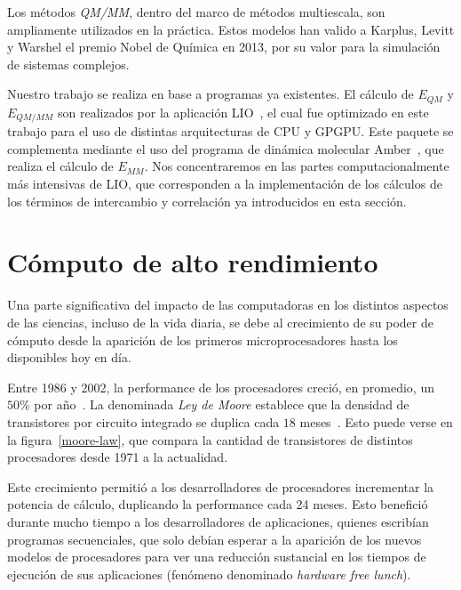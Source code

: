 Los m\'etodos \textit{QM/MM}, dentro del marco de m\'etodos multiescala, son ampliamente utilizados en la pr\'actica. 
Estos modelos han valido a Karplus, Levitt y Warshel el premio Nobel de Qu\'imica en 2013, por su valor para la simulaci\'on de sistemas complejos.

Nuestro trabajo se realiza en base a programas ya existentes. 
El c\'alculo de $E_{QM}$ y $E_{QM/MM}$ son realizados por la aplicaci\'on LIO~\cite{Nitsche2014,TesisNitsche}, el cual fue optimizado en este trabajo para el uso de distintas arquitecturas de CPU y GPGPU. 
Este paquete se complementa mediante el uso del programa de din\'amica molecular Amber~\cite{Amber}, que realiza el c\'alculo de $E_{MM}$. 
Nos concentraremos en las partes computacionalmente m\'as intensivas de LIO, que corresponden a la implementaci\'on de los c\'alculos de los t\'erminos de intercambio y correlaci\'on ya introducidos en esta secci\'on.

\section{C\'omputo de alto rendimiento}

Una parte significativa del impacto de las computadoras en los distintos aspectos de las ciencias, incluso de la vida diaria, se debe al crecimiento de su poder de c\'omputo desde la aparici\'on de los primeros microprocesadores hasta los disponibles hoy en d\'ia.

Entre 1986 y 2002, la performance de los procesadores creci\'o, en promedio, un $50\%$ por a\~no~\cite{Pacheco2011}. 
La denominada \textit{Ley de Moore} establece que la densidad de transistores por circuito integrado se duplica cada $18$ meses~\cite{HennessyPatterson}.
Esto puede verse en la figura~\ref{moore-law}, que compara la cantidad de transistores de distintos procesadores desde 1971 a la actualidad.

Este crecimiento permiti\'o a los desarrolladores de procesadores incrementar la potencia de c\'alculo, duplicando la performance cada 24 meses.
Esto benefici\'o durante mucho tiempo a los desarrolladores de aplicaciones, quienes escrib\'ian programas secuenciales, que solo deb\'ian esperar a la aparici\'on de los nuevos modelos de procesadores para ver una reducci\'on sustancial en los tiempos de ejecuci\'on de sus aplicaciones (fen\'omeno denominado \textit{hardware free lunch}).

